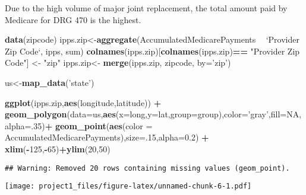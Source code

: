 \documentclass[]{article}
\newenvironment{Shaded}{\begin{snugshade}}{\end{snugshade}}
\newcommand{\KeywordTok}[1]{\textcolor[rgb]{0.13,0.29,0.53}{\textbf{#1}}}
\newcommand{\DataTypeTok}[1]{\textcolor[rgb]{0.13,0.29,0.53}{#1}}
\newcommand{\DecValTok}[1]{\textcolor[rgb]{0.00,0.00,0.81}{#1}}
\newcommand{\FloatTok}[1]{\textcolor[rgb]{0.00,0.00,0.81}{#1}}
\newcommand{\StringTok}[1]{\textcolor[rgb]{0.31,0.60,0.02}{#1}}
\newcommand{\OtherTok}[1]{\textcolor[rgb]{0.56,0.35,0.01}{#1}}
\newcommand{\OperatorTok}[1]{\textcolor[rgb]{0.81,0.36,0.00}{\textbf{#1}}}
\newcommand{\NormalTok}[1]{#1}
\begin{document}
Due to the high volume of major joint replacement, the total amount paid
by Medicare for DRG 470 is the highest.

\begin{Shaded}
\begin{Highlighting}[]
\KeywordTok{data}\NormalTok{(zipcode)}
\NormalTok{ipps.zip<-}\KeywordTok{aggregate}\NormalTok{(AccumulatedMedicarePayments }\OperatorTok{~}\StringTok{ `}\DataTypeTok{Provider Zip Code}\StringTok{`}\NormalTok{, ipps, sum)}
\KeywordTok{colnames}\NormalTok{(ipps.zip)[}\KeywordTok{colnames}\NormalTok{(ipps.zip)}\OperatorTok{==}\StringTok{ "Provider Zip Code"}\NormalTok{] <-}\StringTok{ "zip"}
\NormalTok{ipps.zip<-}\StringTok{ }\KeywordTok{merge}\NormalTok{(ipps.zip, zipcode, }\DataTypeTok{by=}\StringTok{'zip'}\NormalTok{)}
\end{Highlighting}
\end{Shaded}

\begin{Shaded}
\begin{Highlighting}[]
\NormalTok{us<-}\KeywordTok{map_data}\NormalTok{(}\StringTok{'state'}\NormalTok{)}

\KeywordTok{ggplot}\NormalTok{(ipps.zip,}\KeywordTok{aes}\NormalTok{(longitude,latitude)) }\OperatorTok{+}
\StringTok{  }\KeywordTok{geom_polygon}\NormalTok{(}\DataTypeTok{data=}\NormalTok{us,}\KeywordTok{aes}\NormalTok{(}\DataTypeTok{x=}\NormalTok{long,}\DataTypeTok{y=}\NormalTok{lat,}\DataTypeTok{group=}\NormalTok{group),}\DataTypeTok{color=}\StringTok{'gray'}\NormalTok{,}\DataTypeTok{fill=}\OtherTok{NA}\NormalTok{,}\DataTypeTok{alpha=}\NormalTok{.}\DecValTok{35}\NormalTok{)}\OperatorTok{+}
\StringTok{  }\KeywordTok{geom_point}\NormalTok{(}\KeywordTok{aes}\NormalTok{(}\DataTypeTok{color =}\NormalTok{ AccumulatedMedicarePayments),}\DataTypeTok{size=}\NormalTok{.}\DecValTok{15}\NormalTok{,}\DataTypeTok{alpha=}\FloatTok{0.2}\NormalTok{) }\OperatorTok{+}
\StringTok{  }\KeywordTok{xlim}\NormalTok{(}\OperatorTok{-}\DecValTok{125}\NormalTok{,}\OperatorTok{-}\DecValTok{65}\NormalTok{)}\OperatorTok{+}\KeywordTok{ylim}\NormalTok{(}\DecValTok{20}\NormalTok{,}\DecValTok{50}\NormalTok{)}
\end{Highlighting}
\end{Shaded}

\begin{verbatim}
## Warning: Removed 20 rows containing missing values (geom_point).
\end{verbatim}

\texttt{[image: project1\_files/figure-latex/unnamed-chunk-6-1.pdf]}
\end{document}
